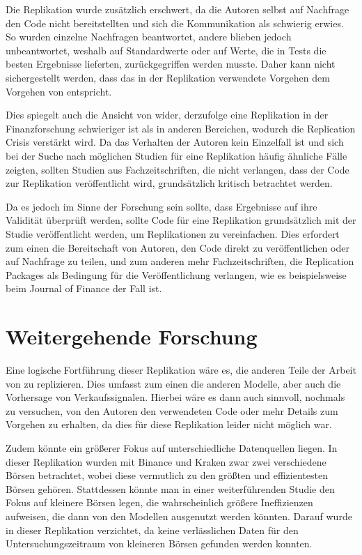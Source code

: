 \documentclass[a4paper, 12pt]{article}
\begin{document}
Die Replikation wurde zusätzlich erschwert, da die Autoren selbst auf Nachfrage den Code nicht bereitstellten und sich die Kommunikation als schwierig erwies.
So wurden einzelne Nachfragen beantwortet, andere blieben jedoch unbeantwortet, weshalb auf Standardwerte oder auf Werte, die in Tests die besten Ergebnisse lieferten, zurückgegriffen werden musste.
Daher kann nicht sichergestellt werden, dass das in der Replikation verwendete Vorgehen dem Vorgehen von \citeauthor{Goutte2023} entspricht.

Dies spiegelt auch die Ansicht von \textcite{Harvey2016} wider, derzufolge eine Replikation in der Finanzforschung schwieriger ist als in anderen Bereichen, wodurch die Replication Crisis verstärkt wird.
Da das Verhalten der Autoren kein Einzelfall ist und sich bei der Suche nach möglichen Studien für eine Replikation häufig ähnliche Fälle zeigten, sollten Studien aus Fachzeitschriften, die nicht verlangen, dass der Code zur Replikation veröffentlicht wird, grundsätzlich kritisch betrachtet werden.

Da es jedoch im Sinne der Forschung sein sollte, dass Ergebnisse auf ihre Validität überprüft werden, sollte Code für eine Replikation grundsätzlich mit der Studie veröffentlicht werden, um Replikationen zu vereinfachen.
Dies erfordert zum einen die Bereitschaft von Autoren, den Code direkt zu veröffentlichen oder auf Nachfrage zu teilen, und zum anderen mehr Fachzeitschriften, die Replication Packages als Bedingung für die Veröffentlichung verlangen, wie es beispielsweise beim Journal of Finance der Fall ist.

\section{Weitergehende Forschung}
Eine logische Fortführung dieser Replikation wäre es, die anderen Teile der Arbeit von \textcite{Goutte2023} zu replizieren.
Dies umfasst zum einen die anderen Modelle, aber auch die Vorhersage von Verkaufssignalen.
Hierbei wäre es dann auch sinnvoll, nochmals zu versuchen, von den Autoren den verwendeten Code oder mehr Details zum Vorgehen zu erhalten, da dies für diese Replikation leider nicht möglich war.

Zudem könnte ein größerer Fokus auf unterschiedliche Datenquellen liegen.
In dieser Replikation wurden mit Binance und Kraken zwar zwei verschiedene Börsen betrachtet, wobei diese vermutlich zu den größten und effizientesten Börsen gehören.
Stattdessen könnte man in einer weiterführenden Studie den Fokus auf kleinere Börsen legen, die wahrscheinlich größere Ineffizienzen aufweisen, die dann von den Modellen ausgenutzt werden könnten.
Darauf wurde in dieser Replikation verzichtet, da keine verlässlichen Daten für den Untersuchungszeitraum von kleineren Börsen gefunden werden konnten.
\end{document}
